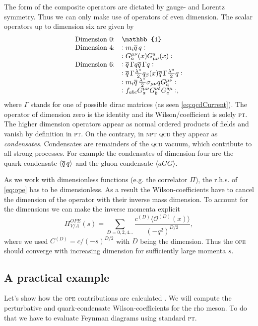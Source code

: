 \documentclass[../../index.tex]{subfiles}
\begin{document}
The form of the composite operators are dictated by gauge- and Lorentz symmetry.
Thus we can only make use of operators of even dimension. The scalar operators
up to dimension six are given by \cite{Pascual1984}
\begin{equation}
  \begin{array}{ll}
    \text{Dimension 0:} & \mathbb{1} \\
    \text{Dimension 4:} & :m_i \anti{q} q: \\
                        & :G_a^{\mu\nu}(x) G_{\mu\nu}^a(x): \\
    \text{Dimension 6:} & :\anti{q} \Gamma q \anti{q} \Gamma q: \\
                        & :\anti{q} \Gamma \frac{\lambda^a}{2} q_\beta(x) \anti{q} \Gamma \frac{\lambda^a}{2} q: \\
                        & :m_i \anti{q} \frac{\lambda^a}{2} \sigma_{\mu\nu} q G^{\mu\nu}_a: \\
                        & :f_{abc} G_a^{\mu\nu} G_b^{\nu\delta} G_c^{\delta\mu}:,
  \end{array}
\end{equation}
where $\Gamma$ stands for one of possible dirac matrices (as seen
\cref{eq:qcdCurrent}). The operator of dimension zero is the identity and its
Wilson\-/coefficient is solely \textsc{pt}. The higher dimension operators
appear as normal ordered products of fields and vanish by definition in
\textsc{pt}. On the contrary, in \textsc{npt qcd} they appear as
\textit{condensates}. Condensates are remainders of the \textsc{qcd} vacuum,
which contribute to all strong processes. For example the condensates of
dimension four are the quark-condensate $\langle \overline{q}\, q \rangle$ and the
gluon-condensate $\langle a GG \rangle$.

As we work with dimensionless functions (e.g. the correlator $\Pi$), the r.h.s.
of \cref{eq:ope} has to be dimensionless. As a result the Wilson-coefficients
have to cancel the dimension of the operator with their inverse mass dimension.
To account for the dimensions we can make the inverse momenta explicit
\begin{equation}
  \Pi_{V/A}^{OPE}(s) = \sum_{D=0,2,4\dots} \frac{c^{(D)} \langle \mathcal{O}^{(D)}(x) \rangle}{(-q^2)^{D/2}},
\end{equation}
where we used $C^{(D)}=c/(-s)^{D/2}$ with $D$ being the dimension. Thus the
\textsc{ope} should converge with increasing dimension for sufficiently large
momenta $s$.

\subsection{A practical example}
Let's show how the \textsc{ope} contributions are calculated \cite{Shifman1978,
  Pascual1984}. We will compute the perturbative and quark-condensate
Wilson-coefficients for the rho meson. To do that we have to evaluate Feynman
diagrams using standard \textsc{pt}.
\end{document}
